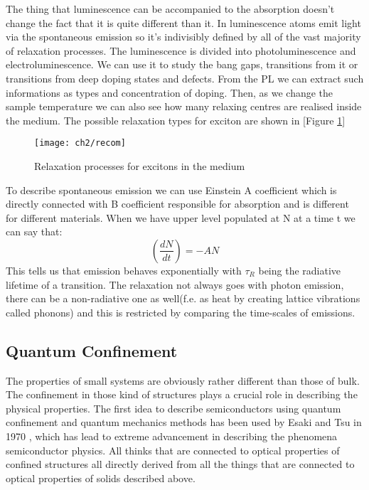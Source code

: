 The thing that luminescence can be accompanied to the absorption doesn't change the fact that it is quite different than it. In luminescence atoms emit light via the spontaneous emission so it's indivisibly defined by all of the vast majority of relaxation processes. The luminescence is divided into photoluminescence and electroluminescence. We can use it to study the bang gaps, transitions from it or transitions from deep doping states and defects. From the PL we can extract such informations as types and concentration of doping. Then, as we change the sample temperature we can also see how many relaxing centres are realised inside the medium. The possible relaxation types for exciton are shown in [Figure \ref{fig:relax}]
\begin{figure}[H]
\centering
\texttt{[image: ch2/recom]}
\caption{Relaxation processes for excitons in the medium\cite{popko}}
\label{fig:relax}
\end{figure}

To describe spontaneous emission we can use Einstein A coefficient which is directly connected with B coefficient responsible for absorption and is different for different materials. When we have upper level populated at N at a time t we can say that:
\begin{equation}
\left( \frac{dN}{dt} \right) = -AN
\end{equation}
This tells us that emission behaves exponentially with $\tau_R $ being the radiative lifetime of a transition. The relaxation not always goes with photon emission, there can be a non-radiative one as well(f.e. as heat by creating lattice vibrations called phonons) and this is restricted by comparing the time-scales of emissions.  

\subsection{Quantum Confinement}

The properties of small systems are obviously rather different than those of bulk. The confinement in those kind of structures plays a crucial role in describing the physical properties. The first idea to describe semiconductors using quantum confinement and quantum mechanics methods has been used by Esaki and Tsu in 1970 \cite{Esaki1970}, which has lead to extreme advancement in describing the phenomena semiconductor physics. All thinks that are connected to optical properties of confined structures all directly derived from all the things that are connected to optical properties of solids described above. 

